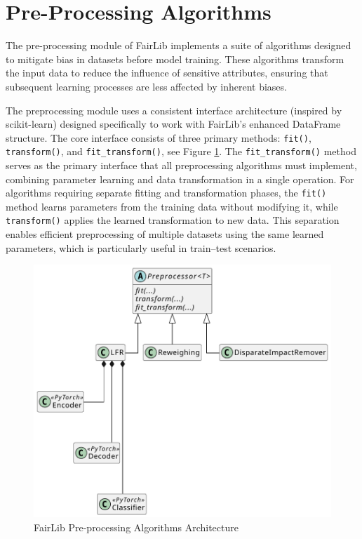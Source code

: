 \documentclass[12pt,a4paper,openright,twoside]{book}
\begin{document}
\section{Pre-Processing Algorithms}
The pre-processing module of FairLib implements a suite of algorithms designed to mitigate bias in datasets before model training. These algorithms transform the input data to reduce the influence of sensitive attributes, ensuring that subsequent learning processes are less affected by inherent biases.

The preprocessing module uses a consistent interface architecture (inspired by scikit-learn) designed specifically to work with FairLib’s enhanced DataFrame structure. The core interface consists of three primary methods: \texttt{fit()}, \texttt{transform()}, and \texttt{fit\_transform()}, see Figure \ref{fig:preprocessing-uml}. The \texttt{fit\_transform()} method serves as the primary interface that all preprocessing algorithms must implement, combining parameter learning and data transformation in a single operation. For algorithms requiring separate fitting and transformation phases, the \texttt{fit()} method learns parameters from the training data without modifying it, while \texttt{transform()} applies the learned transformation to new data. This separation enables efficient preprocessing of multiple datasets using the same learned parameters, which is particularly useful in train–test scenarios.

\begin{figure}
\centering
\includegraphics[width=\textwidth]{figures/uml/preprocessing.pdf}
\caption{FairLib Pre-processing Algorithms Architecture}
\label{fig:preprocessing-uml}
\end{figure}
\end{document}
